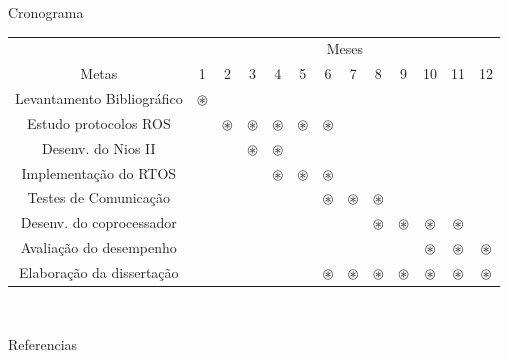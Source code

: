 \documentclass[10pt]{beamer}
\begin{document}
\begin{frame}{Cronograma}

    \begin{table}[h]
    	\centering

    	\vspace{0.2cm}
    	\begin{tabular}{c|cccccccccccc}
    		\toprule
    		 & \multicolumn{12}{c}{{\tiny Meses}}\\ 
    		{\tiny Metas} & {\tiny 1} & {\tiny 2} & {\tiny 3} & {\tiny 4} & {\tiny 5} & {\tiny 6} & {\tiny 7} & {\tiny 8} & {\tiny 9} & {\tiny 10} & {\tiny 11} & {\tiny 12} \\ 
    		\midrule  
    		\midrule                           
    		{\tiny Levantamento Bibliográfico}& $\circledast$ & & & & & & & & & & & \\
    		\hline
    		{\tiny Estudo protocolos ROS} & & $\circledast$ & $\circledast$ & $\circledast$ & $\circledast$ & $\circledast$ & & & & & &  \\
    		\hline
    		{\tiny Desenv. do Nios II} & & & $\circledast$ & $\circledast$ & & & & & & & &  \\
    		\hline
    		{\tiny Implementação } {\tiny do RTOS} & & & & $\circledast$ & $\circledast$ & $\circledast$ & & & & & &  \\
    		\hline
    		{\tiny Testes de Comunicação} & & & & & & $\circledast$ & $\circledast$ & $\circledast$ & & & &  \\
    		\hline
    		{\tiny Desenv. do coprocessador} & & & & & & & & $\circledast$ & $\circledast$ & $\circledast$ & $\circledast$ &  \\
    		\hline
    		{\tiny Avaliação do desempenho} & & & & & & & & & & $\circledast$ & $\circledast$ & $\circledast$ \\
    		\hline
    		{\tiny Elaboração da } {\tiny dissertação} & & & & & & $\circledast$ & $\circledast$ & $\circledast$ & $\circledast$ & $\circledast$ & $\circledast$ & $\circledast$\\
    		\bottomrule 
    
    	\end{tabular}
    	\\
    	\label{tab:crono}
    \end{table}
\end{frame}




\begin{frame}[allowframebreaks]{Referencias}

  
  
  
\end{frame}
\end{document}
